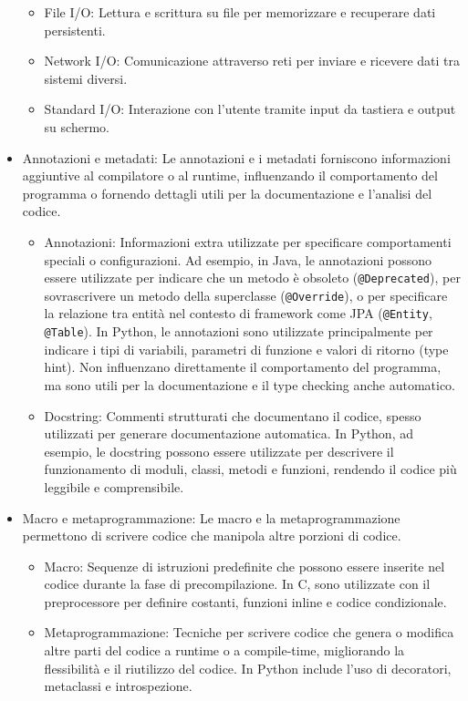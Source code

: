 \documentclass[
  letterpaper,
  DIV=11,
  numbers=noendperiod]{scrreprt}
\providecommand{\tightlist}{%
  \setlength{\itemsep}{0pt}\setlength{\parskip}{0pt}}\usepackage{longtable,booktabs,array}
\begin{document}
\begin{itemize}
  \begin{itemize}
  \tightlist
  \item
    File I/O: Lettura e scrittura su file per memorizzare e recuperare
    dati persistenti.
  \item
    Network I/O: Comunicazione attraverso reti per inviare e ricevere
    dati tra sistemi diversi.
  \item
    Standard I/O: Interazione con l'utente tramite input da tastiera e
    output su schermo.
  \end{itemize}
\item
  Annotazioni e metadati: Le annotazioni e i metadati forniscono
  informazioni aggiuntive al compilatore o al runtime, influenzando il
  comportamento del programma o fornendo dettagli utili per la
  documentazione e l'analisi del codice.

  \begin{itemize}
  \tightlist
  \item
    Annotazioni: Informazioni extra utilizzate per specificare
    comportamenti speciali o configurazioni. Ad esempio, in Java, le
    annotazioni possono essere utilizzate per indicare che un metodo è
    obsoleto (\texttt{@Deprecated}), per sovrascrivere un metodo della
    superclasse (\texttt{@Override}), o per specificare la relazione tra
    entità nel contesto di framework come JPA (\texttt{@Entity},
    \texttt{@Table}). In Python, le annotazioni sono utilizzate
    principalmente per indicare i tipi di variabili, parametri di
    funzione e valori di ritorno (type hint). Non influenzano
    direttamente il comportamento del programma, ma sono utili per la
    documentazione e il type checking anche automatico.
  \item
    Docstring: Commenti strutturati che documentano il codice, spesso
    utilizzati per generare documentazione automatica. In Python, ad
    esempio, le docstring possono essere utilizzate per descrivere il
    funzionamento di moduli, classi, metodi e funzioni, rendendo il
    codice più leggibile e comprensibile.
  \end{itemize}
\item
  Macro e metaprogrammazione: Le macro e la metaprogrammazione
  permettono di scrivere codice che manipola altre porzioni di codice.

  \begin{itemize}
  \tightlist
  \item
    Macro: Sequenze di istruzioni predefinite che possono essere
    inserite nel codice durante la fase di precompilazione. In C, sono
    utilizzate con il preprocessore per definire costanti, funzioni
    inline e codice condizionale.
  \item
    Metaprogrammazione: Tecniche per scrivere codice che genera o
    modifica altre parti del codice a runtime o a compile-time,
    migliorando la flessibilità e il riutilizzo del codice. In Python
    include l'uso di decoratori, metaclassi e introspezione.
  \end{itemize}
\end{itemize}
\end{document}
